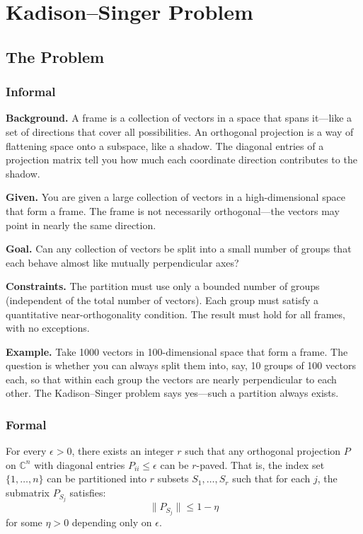 \let\LocalMacro\relax

\chapter{Kadison--Singer Problem}

\section{The Problem}

\subsection{Informal}

\textbf{Background.} A frame is a collection of vectors in a space that spans it---like a set of directions that cover all possibilities. An orthogonal projection is a way of flattening space onto a subspace, like a shadow. The diagonal entries of a projection matrix tell you how much each coordinate direction contributes to the shadow.

\textbf{Given.} You are given a large collection of vectors in a high-dimensional space that form a frame. The frame is not necessarily orthogonal---the vectors may point in nearly the same direction.

\textbf{Goal.} Can any collection of vectors be split into a small number of groups that each behave almost like mutually perpendicular axes?

\textbf{Constraints.} The partition must use only a bounded number of groups (independent of the total number of vectors). Each group must satisfy a quantitative near-orthogonality condition. The result must hold for all frames, with no exceptions.

\textbf{Example.} Take 1000 vectors in 100-dimensional space that form a frame. The question is whether you can always split them into, say, 10 groups of 100 vectors each, so that within each group the vectors are nearly perpendicular to each other. The Kadison--Singer problem says yes---such a partition always exists.

\subsection{Formal}
\begin{conjecture}
For every $\epsilon > 0$, there exists an integer $r$ such that any orthogonal projection $P$ on $\mathbb{C}^n$ with diagonal entries $P_{ii} \leq \epsilon$ can be $r$-paved. That is, the index set $\{1, \ldots, n\}$ can be partitioned into $r$ subsets $S_1, \ldots, S_r$ such that for each $j$, the submatrix $P_{S_j}$ satisfies:
\begin{equation}
\|P_{S_j}\| \leq 1 - \eta
\end{equation}
for some $\eta > 0$ depending only on $\epsilon$.
\end{conjecture}

